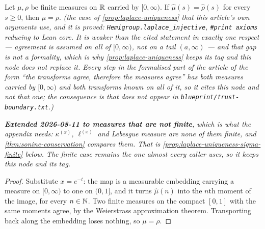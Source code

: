 \begin{proposition}\label{prop:laplace-uniqueness-causal}
\leanok
Let $\mu, \rho$ be finite measures on $\mathbb{R}$ carried by $[0,\infty)$. If
$\hat\mu(s) = \hat\rho(s)$ for every $s \ge 0$, then $\mu = \rho$.
\statusT\quad\emph{(the case of \ref{prop:laplace-uniqueness} that this article's own arguments
use, and it is \emph{proved}: \texttt{Hemigroup.laplace\_injective},
\texttt{\#print axioms} reducing to Lean core. It is weaker than the cited statement in exactly
one respect --- agreement is assumed on all of $[0,\infty)$, not on a tail $(a,\infty)$ --- and
that gap is not a formality, which is why \ref{prop:laplace-uniqueness} keeps its 
tag and this node does not replace it. Every step in the formalised part of the article of the
form ``the transforms agree, therefore the measures agree'' has both measures carried by
$[0,\infty)$ and both transforms known on all of it, so it cites this node and not that one; the
consequence is that  does not appear in \texttt{blueprint/trust-boundary.txt}.)}

\emph{\textbf{Extended 2026-08-11 to measures that are not finite}, which is what the appendix
needs: $\kappa^{(x)}$, $\ell^{(x)}$ and Lebesgue measure are none of them finite, and
\ref{thm:sonine-conservation} compares them. That is \ref{prop:laplace-uniqueness-sigma-finite}
below. The finite case remains the one almost every caller uses, so it keeps this node and its
tag.}
\end{proposition}

\begin{proof}
\leanok
Substitute $x = e^{-t}$: the map is a measurable embedding carrying a measure on $[0,\infty)$
to one on $(0,1]$, and it turns $\hat\mu(n)$ into the $n$th moment of the image, for every
$n \in \mathbb{N}$. Two finite measures on the compact $[0,1]$ with the same moments agree, by the
Weierstrass approximation theorem. Transporting back along the embedding loses nothing, so
$\mu = \rho$.
\end{proof}

